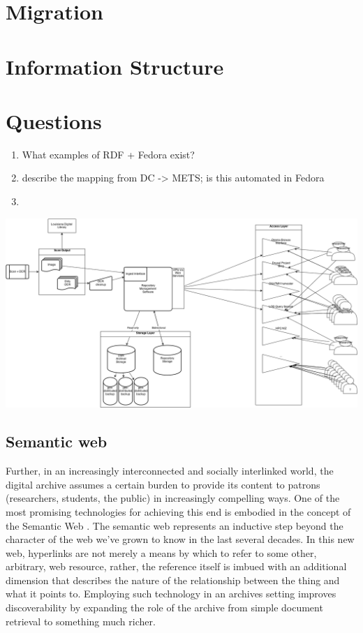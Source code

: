 \documentclass[oneside]{article}
\begin{document}
\section{Migration}


\section{Information Structure}


\section{Questions}
\begin{enumerate}
  \item{What examples of RDF + Fedora exist?}
  \item{describe the mapping from DC -> METS; is this automated in Fedora}
  \item{}
\end{enumerate}

\includegraphics[width=\textwidth]{apc-01.png}

\subsection{Semantic web}
Further, in an increasingly interconnected and socially interlinked world, the digital archive assumes a certain burden to provide its content to patrons (researchers, students, the public) in increasingly compelling ways. One of the most promising technologies for achieving this end is embodied in the concept of the Semantic Web \needcite[TBL]. The semantic web represents an inductive step beyond the character of the web we've grown to know in the last several decades. In this new web, hyperlinks are not merely a means by which to refer to some other, arbitrary, web resource, rather, the reference itself is imbued with an additional dimension that describes the nature of the relationship between the thing and what it points to. \needcite[Barthes?] Employing such technology in an archives setting improves discoverability by expanding the role of the archive from simple document retrieval to something much richer.


\end{document}

